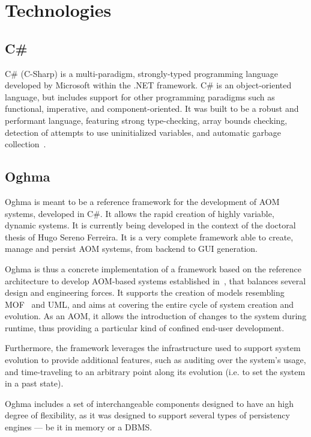 \chapter{Technologies}\label{chap:technologies}

\section{C\#}\label{sec:csharp}

C\# (C-Sharp) is a multi-paradigm, strongly-typed programming language developed by Microsoft within the .NET framework. C\# is an object-oriented language, but includes support for other programming paradigms such as functional, imperative, and component-oriented. It was built to be a robust and performant language, featuring strong type-checking, array bounds checking, detection of attempts to use uninitialized variables, and automatic garbage collection~\cite{csharp}.

\section{Oghma}\label{sec:oghma}

Oghma is meant to be a reference framework for the development of AOM systems, developed in C\#. It allows the rapid creation of highly variable, dynamic systems. It is currently being developed in the context of the doctoral thesis of Hugo Sereno Ferreira. It is a very complete framework able to create, manage and persist AOM systems, from backend to GUI generation.

Oghma is thus a concrete implementation of a framework based on the reference architecture to develop AOM-based systems established in~\cite{ferreira_phd_2010}, that balances several design and engineering forces. It supports the creation of models resembling MOF~\cite{mof} and UML, and aims at covering the entire cycle of system creation and evolution. As an AOM, it allows the introduction of changes to the system during runtime, thus providing a particular kind of confined end-user development.

Furthermore, the framework leverages the infrastructure used to support system evolution to provide additional features, such as auditing over the system’s usage, and time-traveling to an arbitrary point along its evolution (i.e. to set the system in a past state).

Oghma includes a set of interchangeable components designed to have an high degree of flexibility, as it was designed to support several types of persistency engines --- be it in memory or a DBMS.

